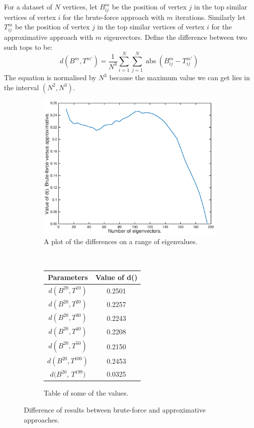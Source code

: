 \documentclass[12pt]{report}
\begin{document}
For a dataset of $N$ vertices, let $B^m_{ij}$ be the position of vertex $j$ in
the top similar vertices of vertex $i$ for the brute-force approach with $m$
iterations. Similarly let $T^{m}_{ij}$ be the position of vertex $j$ in the top
similar vertices of vertex $i$ for the approximative approach with $m$ eigenvectors.
Define the difference between two such tops to be:
%
\begin{equation} d(B^m, T^{m'}) = \frac{1}{N^3} \sum_{i=1}^N \sum_{j=1}^N \operatorname{abs}(B^m_{ij} - T^{m'}_{ij}) \end{equation}
%
The equation is normalised by $N^3$ because the maximum value we can get lies in
the interval $(N^2, N^3)$.
%
\begin{figure}[tpb]
        \centering
        \begin{subfigure}[b]{0.6\textwidth}
	        \includegraphics[width=\textwidth]{no-of-eigenvectors}
        		\caption{A plot of the differences on a range of eigenvalues.}
        \end{subfigure}%
        ~
        \begin{subfigure}[b]{0.4\textwidth}
           \centering
           \def\arraystretch{1.5}
           \begin{tabular}{|c|c|}
	   \hline
	   Parameters & Value of d() \\
	   \hline
	   $d(B^{20}, T^{10})$ & 0.2501 \\
	   \hline
	   $d(B^{20}, T^{20})$ & 0.2257   \\
	   \hline
   	   $d(B^{20}, T^{30})$ & 0.2243   \\
	   \hline
	   $d(B^{20}, T^{40})$ & 0.2208   \\
	   \hline
	   $d(B^{20}, T^{50})$ & 0.2150 \\
	   \hline
	   $d(B^{20}, T^{100})$ & 0.2453\\
	   \hline
	    $d(B^{20}$, $T^{199})$ & 0.0325 \\
	    \hline
	   \end{tabular}
	   \caption{Table of some of the values.}
	   \label{tbl:comparisons}
        \end{subfigure}%
        \caption{Difference of results between brute-force and approximative approaches.}
	\label{fig:no-of-eigenvectors}
\end{figure}
%
\end{document}
